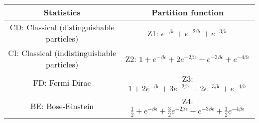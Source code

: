 \begin{tabular}[12pt]{ |c| c|}
    \hline
    \textbf{Statistics} & \textbf{Partition function}\\ 
    \hline
    CD: Classical (distinguishable particles) & Z1: $e^{-\beta\epsilon}+e^{-2\beta\epsilon}+e^{-3\beta\epsilon}$ \\
    \hline 
    CI: Classical (indistinguishable particles) & Z2: $1+e^{-\beta\epsilon}+2e^{-2\beta\epsilon}+e^{-3\beta\epsilon}+e^{-4\beta\epsilon}$ \\
    \hline
    FD: Fermi-Dirac & Z3: $1+2e^{-\beta\epsilon}+3e^{-2\beta\epsilon}+2e^{-3\beta\epsilon}+e^{-4\beta\epsilon}$ \\
    \hline 
    BE: Bose-Einstein & Z4: $\frac{1}{2}+e^{-\beta\epsilon}+\frac{3}{2}e^{-2\beta\epsilon}+e^{-3\beta\epsilon}+\frac{1}{2}e^{-4\beta\epsilon}$ \\
    \hline
\end{tabular}
